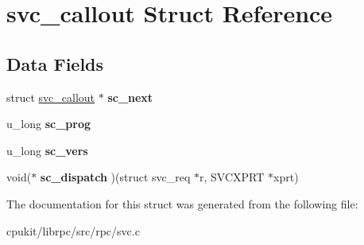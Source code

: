 \hypertarget{structsvc__callout}{}\section{svc\+\_\+callout Struct Reference}
\label{structsvc__callout}
\subsection*{Data Fields}
\begin{DoxyCompactItemize}
\item 
\mbox{\label{structsvc__callout_a51d75f2948cc0d1354c3a2e0463a28c7}} 
struct \mbox{\hyperlink{structsvc__callout}{svc\+\_\+callout}} $\ast$ {\bfseries sc\+\_\+next}
\item 
\mbox{\label{structsvc__callout_a00a341adce81a9f013da2505bcdad83d}} 
u\+\_\+long {\bfseries sc\+\_\+prog}
\item 
\mbox{\label{structsvc__callout_a5fe510aef04e21ec4be11d7b004974bf}} 
u\+\_\+long {\bfseries sc\+\_\+vers}
\item 
\mbox{\label{structsvc__callout_a621f134c78facdccb362b2895ddff312}} 
void($\ast$ {\bfseries sc\+\_\+dispatch} )(struct svc\+\_\+req $\ast$r, S\+V\+C\+X\+P\+RT $\ast$xprt)
\end{DoxyCompactItemize}


The documentation for this struct was generated from the following file\+:\begin{DoxyCompactItemize}
\item 
cpukit/librpc/src/rpc/svc.\+c\end{DoxyCompactItemize}
